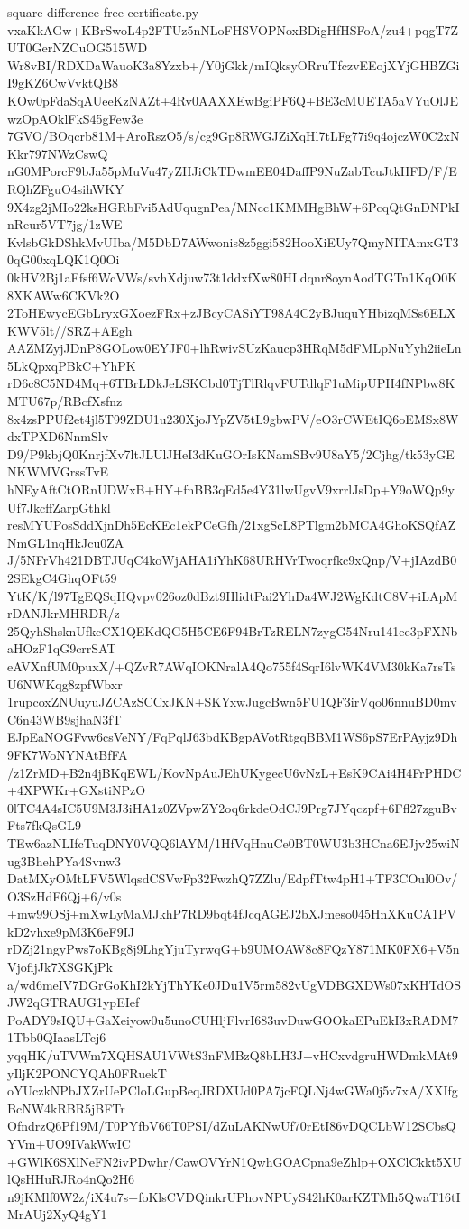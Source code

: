\documentclass[11pt]{article}
\theoremstyle{definition}
\theoremstyle{remark}
\begin{document}
\begin{filecontents*}[overwrite]{square-difference-free-certificate.py}
vxaKkAGw+KBrSwoL4p2FTUz5nNLoFHSVOPNoxBDigHfHSFoA/zu4+pqgT7ZUT0GerNZCuOG515WD
Wr8vBI/RDXDaWauoK3a8Yzxb+/Y0jGkk/mIQksyORruTfczvEEojXYjGHBZGiI9gKZ6CwVvktQB8
KOw0pFdaSqAUeeKzNAZt+4Rv0AAXXEwBgiPF6Q+BE3cMUETA5aVYuOlJEwzOpAOklFkS45gFew3e
7GVO/BOqcrb81M+AroRszO5/s/cg9Gp8RWGJZiXqHl7tLFg77i9q4ojczW0C2xNKkr797NWzCswQ
nG0MPorcF9bJa55pMuVu47yZHJiCkTDwmEE04DaffP9NuZabTcuJtkHFD/F/ERQhZFguO4sihWKY
9X4zg2jMIo22ksHGRbFvi5AdUqugnPea/MNcc1KMMHgBhW+6PcqQtGnDNPkInReur5VT7jg/1zWE
KvlsbGkDShkMvUIba/M5DbD7AWwonis8z5ggi582HooXiEUy7QmyNITAmxGT30qG00xqLQK1Q0Oi
0kHV2Bj1aFfsf6WcVWs/svhXdjuw73t1ddxfXw80HLdqnr8oynAodTGTn1KqO0K8XKAWw6CKVk2O
2ToHEwycEGbLryxGXoezFRx+zJBcyCASiYT98A4C2yBJuquYHbizqMSs6ELXKWV5lt//SRZ+AEgh
AAZMZyjJDnP8GOLow0EYJF0+lhRwivSUzKaucp3HRqM5dFMLpNuYyh2iieLn5LkQpxqPBkC+YhPK
rD6c8C5ND4Mq+6TBrLDkJeLSKCbd0TjTlRlqvFUTdlqF1uMipUPH4fNPbw8KMTU67p/RBcfXsfnz
8x4zsPPUf2et4jl5T99ZDU1u230XjoJYpZV5tL9gbwPV/eO3rCWEtIQ6oEMSx8WdxTPXD6NnmSlv
D9/P9kbjQ0KnrjfXv7ltJLUlJHeI3dKuGOrIsKNamSBv9U8aY5/2Cjhg/tk53yGENKWMVGrssTvE
hNEyAftCtORnUDWxB+HY+fnBB3qEd5e4Y31lwUgvV9xrrlJsDp+Y9oWQp9yUf7JkcffZarpGthkl
resMYUPosSddXjnDh5EcKEc1ekPCeGfh/21xgScL8PTlgm2bMCA4GhoKSQfAZNmGL1nqHkJcu0ZA
J/5NFrVh421DBTJUqC4koWjAHA1iYhK68URHVrTwoqrfkc9xQnp/V+jIAzdB02SEkgC4GhqOFt59
YtK/K/l97TgEQSqHQvpv026oz0dBzt9HlidtPai2YhDa4WJ2WgKdtC8V+iLApMrDANJkrMHRDR/z
25QyhShsknUfkcCX1QEKdQG5H5CE6F94BrTzRELN7zygG54Nru141ee3pFXNbaHOzF1qG9crrSAT
eAVXnfUM0puxX/+QZvR7AWqIOKNralA4Qo755f4SqrI6lvWK4VM30kKa7rsTsU6NWKqg8zpfWbxr
1rupcoxZNUuyuJZCAzSCCxJKN+SKYxwJugcBwn5FU1QF3irVqo06nnuBD0mvC6n43WB9sjhaN3fT
EJpEaNOGFvw6csVeNY/FqPqlJ63bdKBgpAVotRtgqBBM1WS6pS7ErPAyjz9Dh9FK7WoNYNAtBfFA
/z1ZrMD+B2n4jBKqEWL/KovNpAuJEhUKygecU6vNzL+EsK9CAi4H4FrPHDC+4XPWKr+GXstiNPzO
0lTC4A4sIC5U9M3J3iHA1z0ZVpwZY2oq6rkdeOdCJ9Prg7JYqczpf+6Ffl27zguBvFts7fkQsGL9
TEw6azNLIfcTuqDNY0VQQ6lAYM/1HfVqHnuCe0BT0WU3b3HCna6EJjv25wiNug3BhehPYa4Svnw3
DatMXyOMtLFV5WlqsdCSVwFp32FwzhQ7ZZlu/EdpfTtw4pH1+TF3COul0Ov/O3SzHdF6Qj+6/v0s
+mw99OSj+mXwLyMaMJkhP7RD9bqt4fJcqAGEJ2bXJmeso045HnXKuCA1PVkD2vhxe9pM3K6eF9IJ
rDZj21ngyPws7oKBg8j9LhgYjuTyrwqG+b9UMOAW8c8FQzY871MK0FX6+V5nVjofijJk7XSGKjPk
a/wd6meIV7DGrGoKhI2kYjThYKe0JDu1V5rm582vUgVDBGXDWs07xKHTdOSJW2qGTRAUG1ypEIef
PoADY9sIQU+GaXeiyow0u5unoCUHljFlvrI683uvDuwGOOkaEPuEkI3xRADM71Tbb0QIaasLTcj6
yqqHK/uTVWm7XQHSAU1VWtS3nFMBzQ8bLH3J+vHCxvdgruHWDmkMAt9yIljK2PONCYQAh0FRuekT
oYUczkNPbJXZrUePCloLGupBeqJRDXUd0PA7jcFQLNj4wGWa0j5v7xA/XXIfgBcNW4kRBR5jBFTr
OfndrzQ6Pf19M/T0PYfbV66T0PSI/dZuLAKNwUf70rEtI86vDQCLbW12SCbsQYVm+UO9IVakWwIC
+GWlK6SXlNeFN2ivPDwhr/CawOVYrN1QwhGOACpna9eZhlp+OXClCkkt5XUlQsHHuRJRo4nQo2H6
n9jKMlf0W2z/iX4u7s+foKlsCVDQinkrUPhovNPUyS42hK0arKZTMh5QwaT16tIMrAUj2XyQ4gY1

\end{filecontents*}
\end{document}
